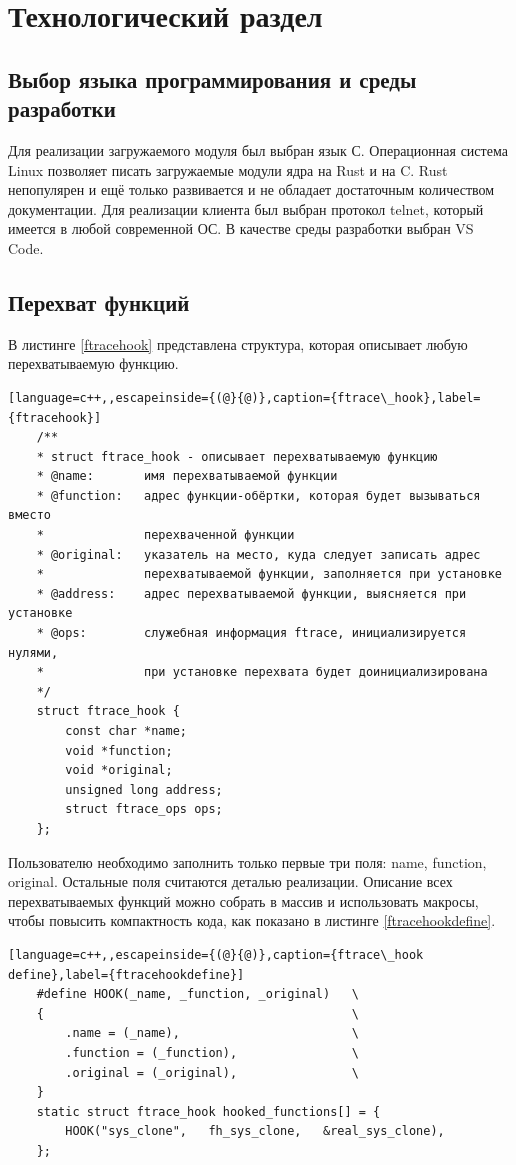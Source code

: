 \chapter{Технологический раздел}

\section{Выбор  языка программирования и среды разработки}
Для реализации загружаемого модуля был выбран язык С. 
Операционная система Linux позволяет писать загружаемые модули ядра на Rust и на C. 
Rust непопулярен и ещё только развивается и не обладает достаточным количеством документации.
Для реализации клиента был выбран протокол telnet, который имеется в любой современной ОС.
В качестве среды разработки выбран VS Code.

\section{Перехват функций}
В листинге \ref{ftracehook} представлена структура, которая описывает любую перехватываемую функцию.
\begin{lstlisting}[language=c++,,escapeinside={(@}{@)},caption={ftrace\_hook},label={ftracehook}]
	/**
	* struct ftrace_hook - описывает перехватываемую функцию
	* @name:       имя перехватываемой функции
	* @function:   адрес функции-обёртки, которая будет вызываться вместо
	*              перехваченной функции
	* @original:   указатель на место, куда следует записать адрес
	*              перехватываемой функции, заполняется при установке
	* @address:    адрес перехватываемой функции, выясняется при установке
	* @ops:        служебная информация ftrace, инициализируется нулями,
	*              при установке перехвата будет доинициализирована
	*/
	struct ftrace_hook {
		const char *name;
		void *function;
		void *original;
		unsigned long address;
		struct ftrace_ops ops;
	};
\end{lstlisting}

Пользователю необходимо заполнить только первые три поля: name, function, original. Остальные поля считаются деталью реализации. Описание всех перехватываемых функций можно собрать в массив и использовать макросы, чтобы повысить компактность кода, как показано в листинге \ref{ftracehookdefine}.

\newpage
\begin{lstlisting}[language=c++,,escapeinside={(@}{@)},caption={ftrace\_hook define},label={ftracehookdefine}]
	#define HOOK(_name, _function, _original)   \
	{                                       	\
		.name = (_name),                    	\
		.function = (_function),            	\
		.original = (_original),            	\
	}
	static struct ftrace_hook hooked_functions[] = {
		HOOK("sys_clone",   fh_sys_clone,   &real_sys_clone),
	};
\end{lstlisting}

